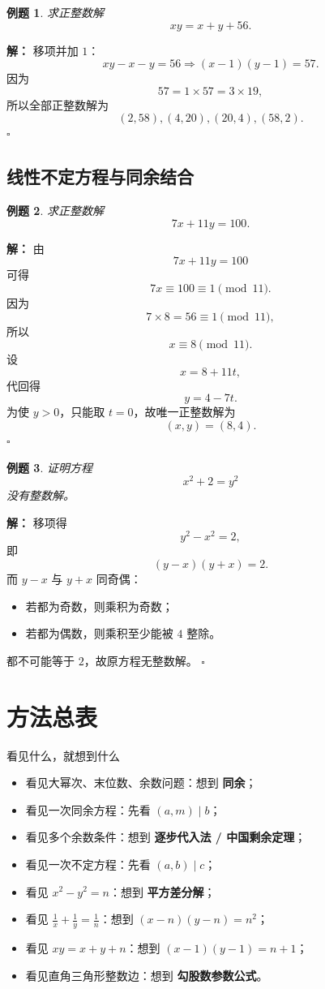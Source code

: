 \documentclass[11pt,a4paper,fontset=fandol]{ctexart}
\theoremstyle{formaltheorem}
\theoremstyle{formalexample}
\newtheorem{example}{例题}[section]
\newenvironment{solution}{\par\noindent\textbf{解：}}{\hfill$\square$\par}
\begin{document}
\begin{example}
求正整数解
\[
xy=x+y+56.
\]
\end{example}

\begin{solution}
移项并加 $1$：
\[
xy-x-y=56\Rightarrow (x-1)(y-1)=57.
\]
因为
\[
57=1\times 57=3\times 19,
\]
所以全部正整数解为
\[
\boxed{(2,58),(4,20),(20,4),(58,2)}.
\]
\end{solution}

\subsection{线性不定方程与同余结合}

\begin{example}
求正整数解
\[
7x+11y=100.
\]
\end{example}

\begin{solution}
由
\[
7x+11y=100
\]
可得
\[
7x\equiv 100\equiv 1\pmod{11}.
\]
因为
\[
7\times 8=56\equiv 1\pmod{11},
\]
所以
\[
x\equiv 8\pmod{11}.
\]
设
\[
x=8+11t,
\]
代回得
\[
y=4-7t.
\]
为使 $y>0$，只能取 $t=0$，故唯一正整数解为
\[
\boxed{(x,y)=(8,4)}.
\]
\end{solution}

\begin{example}
证明方程
\[
x^2+2=y^2
\]
没有整数解。
\end{example}

\begin{solution}
移项得
\[
y^2-x^2=2,
\]
即
\[
(y-x)(y+x)=2.
\]
而 $y-x$ 与 $y+x$ 同奇偶：
\begin{itemize}
  \item 若都为奇数，则乘积为奇数；
  \item 若都为偶数，则乘积至少能被 $4$ 整除。
\end{itemize}
都不可能等于 $2$，故原方程无整数解。
\end{solution}

\section{方法总表}

\begin{goalbox}{看见什么，就想到什么}
\begin{itemize}
  \item 看见大幂次、末位数、余数问题：想到 \textbf{同余}；
  \item 看见一次同余方程：先看 \textbf{$(a,m)\mid b$}；
  \item 看见多个余数条件：想到 \textbf{逐步代入法 / 中国剩余定理}；
  \item 看见一次不定方程：先看 \textbf{$(a,b)\mid c$}；
  \item 看见 $x^2-y^2=n$：想到 \textbf{平方差分解}；
  \item 看见 $\frac1x+\frac1y=\frac1n$：想到 \textbf{$(x-n)(y-n)=n^2$}；
  \item 看见 $xy=x+y+n$：想到 \textbf{$(x-1)(y-1)=n+1$}；
  \item 看见直角三角形整数边：想到 \textbf{勾股数参数公式}。
\end{itemize}
\end{goalbox}
\end{document}
